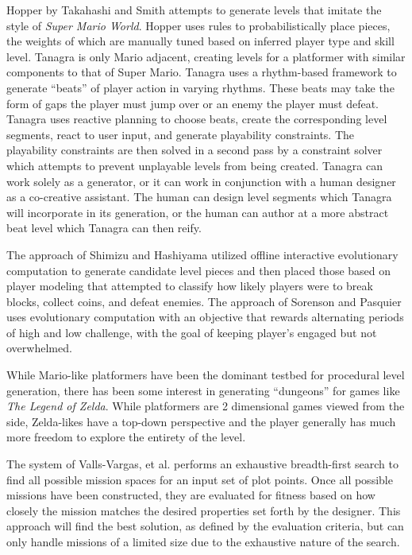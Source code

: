 \documentclass[12pt]{report}
\begin{document}
Hopper by Takahashi and Smith \cite{mario2010} attempts to generate levels that imitate the style of \textit{Super Mario World}.  Hopper uses rules to probabilistically place pieces, the weights of which are manually tuned based on inferred player type and skill level. Tanagra \cite{tanagra} is only Mario adjacent, creating levels for a platformer with similar components to that of Super Mario.  Tanagra uses a rhythm-based framework to generate ``beats'' of player action in varying rhythms.  These beats may take the form of gaps the player must jump over or an enemy the player must defeat.   Tanagra uses reactive planning to choose beats, create the corresponding level segments, react to user input, and generate playability constraints.  The playability constraints are then solved in a second pass by a constraint solver which attempts to prevent unplayable levels from being created.  Tanagra can work solely as a generator, or it can work in conjunction with a human designer as a co-creative assistant.  The human can design level segments which Tanagra will incorporate in its generation, or the human can author at a more abstract beat level which Tanagra can then reify.

The approach of Shimizu and Hashiyama \cite{mario2010} utilized offline interactive evolutionary computation to generate candidate level pieces and then placed those based on player modeling that attempted to classify how likely players were to break blocks, collect coins, and defeat enemies.  The approach of Sorenson and Pasquier \cite{sorpasq} uses evolutionary computation with an objective that rewards alternating periods of high and low challenge, with the goal of keeping player's engaged but not overwhelmed.  

While Mario-like platformers have been the dominant testbed for procedural level generation, there has been some interest in generating ``dungeons'' for games like \textit{The Legend of Zelda}.  While platformers are 2 dimensional games viewed from the side, Zelda-likes have a top-down perspective and the player generally has much more freedom to explore the entirety of the level.

  The system of Valls-Vargas, et al. \cite{VARGASPLOTPOINTS} performs an exhaustive breadth-first search to find all possible  mission spaces for an input set of plot points.  Once all possible missions have been constructed, they are evaluated for fitness based on how closely the mission matches the desired properties set forth by the designer.  This approach will find the best solution, as defined by the evaluation criteria, but can only handle missions of a limited size due to the exhaustive nature of the search.  
\end{document}
